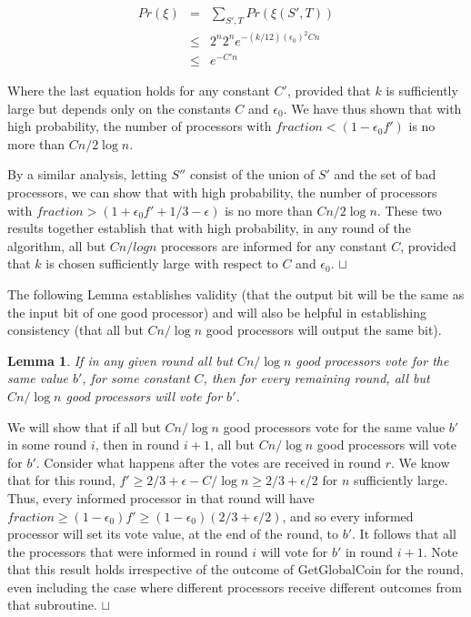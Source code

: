 \documentclass[letterpaper,11pt]{article}
\newtheorem{lemma}{Lemma}
\newcommand{\sq}{\hbox{\rlap{$\sqcap$}$\sqcup$}}
\newcommand{\qed}{\hspace*{\fill}\sq}
\newenvironment{proof}{\noindent {\bf Proof:}}{\qed\par\vskip 4mm\par}
\begin{document}
\begin{proof}
\begin{eqnarray*}
Pr (\xi) &= & \sum_{S',T} Pr(\xi(S',T)) \\
& \leq & 2^{n}2^{n}e^{-(k/12)(\epsilon_{0})^{2} C n} \\
& \leq & e^{-C' n}
\end{eqnarray*}

Where the last equation holds for any constant $C'$, provided that $k$ is sufficiently large but depends only on the constants $C$ and $\epsilon_{0}$.  We have thus shown that with high probability, the number of processors with $fraction < (1-\epsilon_{0} f')$ is no more than $C n/ 2\log n$.  

By a similar analysis, letting $S''$ consist of the union of $S'$ and the set of bad processors, we can show that with high probability, the number of processors with $fraction > (1+ \epsilon_{0} f' + 1/3 - \epsilon)$ is no more than $C n/ 2\log n$.  These two results together establish that with high probability, in any round of the algorithm, all but $Cn/ log n$ processors are informed for any constant $C$, provided that $k$ is chosen sufficiently large with respect to $C$ and $\epsilon_{0}$.
\end{proof}


The following Lemma establishes validity (that the output bit will be the same as the input bit of one good processor) and will also be helpful in establishing consistency (that all but $Cn/\log n$ good processors will output the same bit).

\begin{lemma} \label{l:validity}
If in any given round all but $Cn/\log n$ good processors vote for the same value $b'$, for some constant $C$, then for every remaining round, all but $Cn/ \log n$ good processors will vote for $b'$.
\end{lemma}

\begin{proof}
We will show that if all but $Cn/\log n$ good processors vote for the same value $b'$ in some round $i$, then in round $i+1$, all but $Cn/ \log n$ good processors will vote for $b'$.  Consider what happens after the votes are received in round $r$.  We know that for this round, $f' \geq 2/3 + \epsilon - C/ \log n \geq 2/3 + \epsilon/2$ for $n$ sufficiently large.  Thus, every informed processor in that round will have $fraction \geq (1-\epsilon_{0}) f' \geq (1-\epsilon_{0}) (2/3 + \epsilon/2)$, and so every informed processor will set its vote value, at the end of the round, to $b'$.  It follows that all the processors that were informed in round $i$ will vote for $b'$ in round $i+1$.  Note that this result holds irrespective of the outcome of GetGlobalCoin for the round, even including the case where different processors receive different outcomes from that subroutine.
\end{proof}
\end{document}
